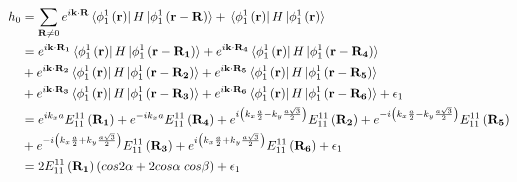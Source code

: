 \documentclass{report}
\begin{document}
\begin{align}
    h_0 & = \sum_{\mathbf{R} \neq 0} e^{i\mathbf{k\cdot R}} \bra*{\phi_1^1 \left(\mathbf{r}\right)} H \ket*{\phi_1^1\left(\mathbf{r}-\mathbf{R}\right)}
    + \bra*{\phi_1^1 \left(\mathbf{r}\right)} H \ket*{\phi_1^1\left(\mathbf{r}\right)}  \nonumber                                                                                                                                                                                                                                         \\
        & = e^{i\mathbf{k\cdot R_1}} \bra*{\phi_1^1 \left(\mathbf{r}\right)} H \ket*{\phi_1^1\left(\mathbf{r}-\mathbf{R_1}\right)} + e^{i\mathbf{k\cdot R_4}} \bra*{\phi_1^1 \left(\mathbf{r}\right)} H \ket*{\phi_1^1\left(\mathbf{r}-\mathbf{R_4}\right)} \nonumber                                                                     \\
        & + e^{i\mathbf{k\cdot R_2}} \bra*{\phi_1^1 \left(\mathbf{r}\right)} H \ket*{\phi_1^1\left(\mathbf{r}-\mathbf{R_2}\right)} + e^{i\mathbf{k\cdot R_5}} \bra*{\phi_1^1 \left(\mathbf{r}\right)} H \ket*{\phi_1^1\left(\mathbf{r}-\mathbf{R_5}\right)} \nonumber                                                                     \\
        & + e^{i\mathbf{k\cdot R_3}} \bra*{\phi_1^1 \left(\mathbf{r}\right)} H \ket*{\phi_1^1\left(\mathbf{r}-\mathbf{R_3}\right)} + e^{i\mathbf{k\cdot R_6}} \bra*{\phi_1^1 \left(\mathbf{r}\right)} H \ket*{\phi_1^1\left(\mathbf{r}-\mathbf{R_6}\right)} + \epsilon_1 \nonumber                                                        \\
        & = e^{i k_x a} E_{11}^{11}\left(\mathbf{R_1}\right) + e^{-i k_x a} E_{11}^{11}\left(\mathbf{R_4}\right) +  e^{i \left( k_x \frac{a}{2} - k_y \frac{a\sqrt{3}}{2} \right)} E_{11}^{11}\left(\mathbf{R_2}\right) +  e^{-i \left( k_x \frac{a}{2} - k_y \frac{a\sqrt{3}}{2} \right)} E_{11}^{11}\left(\mathbf{R_5}\right) \nonumber \\
        & + e^{-i \left( k_x \frac{a}{2} + k_y \frac{a\sqrt{3}}{2} \right)} E_{11}^{11}\left(\mathbf{R_3}\right) + e^{i \left( k_x \frac{a}{2} + k_y \frac{a\sqrt{3}}{2} \right)} E_{11}^{11}\left(\mathbf{R_6}\right) + \epsilon_1 \nonumber                                                                                             \\
        & = 2 E_{11}^{11}\left(\mathbf{R_1}\right) \left(cos2\alpha + 2cos\alpha\; cos\beta\right) + \epsilon_1  \nonumber
\end{align}
\clearpage
\end{document}
